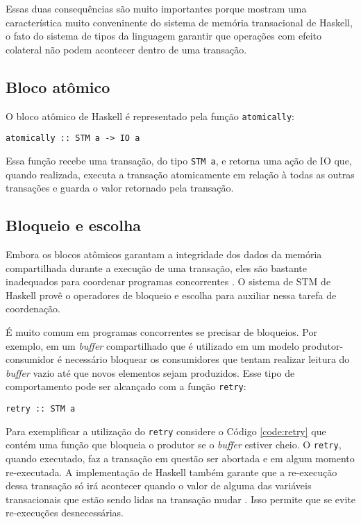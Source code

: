 Essas duas consequências são muito importantes porque mostram uma característica muito conveninente do sistema de memória transacional de Haskell, o fato do sistema de tipos da linguagem garantir que operações com efeito colateral não podem acontecer dentro de uma transação.

\subsection{Bloco atômico}

O bloco atômico de Haskell é representado pela função \verb|atomically|:
\begin{verbatim}
atomically :: STM a -> IO a
\end{verbatim}

Essa função recebe uma transação, do tipo \verb|STM a|, e retorna uma ação de IO que, quando realizada, executa a transação atomicamente em relação à todas as outras transações  e guarda o valor retornado pela transação.

\subsection{Bloqueio e escolha}

Embora os blocos atômicos garantam a integridade dos dados da memória compartilhada durante a execução de uma transação, eles são bastante inadequados para coordenar programas concorrentes \cite{jones2007beautiful}. O sistema de STM de Haskell provê o operadores de bloqueio e escolha para auxiliar nessa tarefa de coordenação.

É muito comum em programas concorrentes se precisar de bloqueios. Por exemplo, em um \emph{buffer} compartilhado que é utilizado em um modelo produtor-consumidor é necessário bloquear os consumidores que tentam realizar leitura do \emph{buffer} vazio até que novos elementos sejam produzidos. Esse tipo de comportamento pode ser alcançado com a função \verb|retry|:
\begin{verbatim}
retry :: STM a
\end{verbatim}

Para exemplificar a utilização do \verb|retry| considere o Código \ref{code:retry} que contém uma função que bloqueia o produtor se o \emph{buffer} estiver cheio. O \verb|retry|, quando executado, faz a transação em questão ser abortada e em algum momento re-executada. A implementação de Haskell também garante que a re-execução dessa transação só irá acontecer quando o valor de alguma das variáveis transacionais que estão sendo lidas na transação mudar \cite{harris2005composable}. Isso permite que se evite re-execuções desnecessárias.

